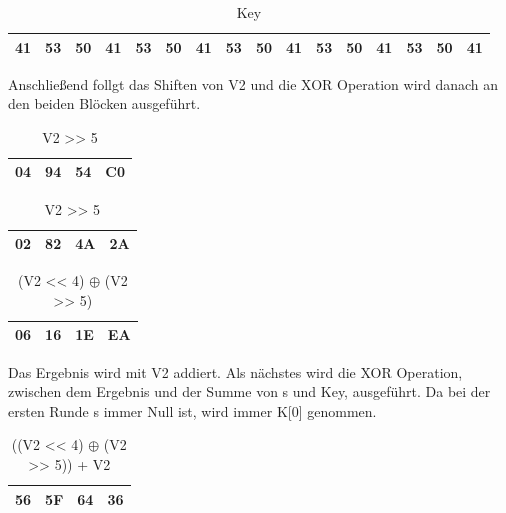 \documentclass[course=asp]{aspdoc}
\begin{document}
\begin{table}[H]
\centering
    \begin{tabular}{|l|l|l|l||l|l|l|l||l|l|l|l||l|l|l|l|}
        \hline
        41 & 53 & 50 & 41 & 53 & 50 & 41 & 53  & 50 & 41 & 53 & 50 & 41 & 53 & 50 & 41 \\
        \hline
    \end{tabular}
    \caption{Key}
\end{table}


Anschließend follgt das Shiften von V2 und die XOR Operation wird danach an den beiden Blöcken ausgeführt.
\begin{table}[H]

    \begin{minipage}{.5\linewidth}

      \centering
        \begin{tabular}{|l|l|l|l|}
		\hline
            04 & 94 & 54 & C0   \\
		\hline
        \end{tabular}

	\caption{V2 << 4}
    \end{minipage}%
    \begin{minipage}{.5\linewidth}

 \centering

        \begin{tabular}{|l|l|l|l|}
           \hline
		 02 & 82 & 4A & 2A   \\
		\hline
        \end{tabular}
\caption{V2 >> 5}
    \end{minipage}
\end{table}

\begin{table}[H]
\centering
    \begin{tabular}{|l|l|l|l|}
        \hline
        06 & 16 & 1E & EA    \\
        \hline
    \end{tabular}
    \caption{(V2 << 4) $\oplus$ (V2 >> 5)}
\end{table}
Das Ergebnis wird mit V2 addiert. Als nächstes wird die XOR Operation, zwischen dem Ergebnis und der Summe von s und Key, ausgeführt. Da bei der ersten Runde s immer Null ist, wird immer K[0] genommen.
\begin{table}[H]
\centering
    \begin{tabular}{|l|l|l|l|}
        \hline
        56 & 5F & 64 & 36    \\
        \hline
    \end{tabular}
    \caption{((V2 << 4) $\oplus$ (V2 >> 5)) + V2}
\end{table}
\end{document}

